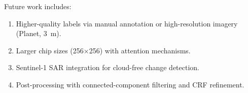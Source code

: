 \documentclass[10pt,a4paper,onecolumn]{article}
\begin{document}
Future work includes:
\begin{enumerate}[nosep]
    \item Higher-quality labels via manual annotation or
          high-resolution imagery (Planet, 3~m).
    \item Larger chip sizes (256$\times$256) with attention
          mechanisms.
    \item Sentinel-1 SAR integration for cloud-free change detection.
    \item Post-processing with connected-component filtering and
          CRF refinement.
\end{enumerate}

\small


\end{document}
